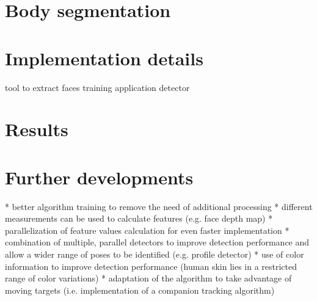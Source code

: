 \documentclass[a4paper,12pt,titlepage]{article}
\begin{document}
\section{Body segmentation}

\section{Implementation details}
tool to extract faces
training application
detector


\section{Results}

\section{Further developments}
* better algorithm training to remove the need of additional processing
* different measurements can be used to calculate features (e.g. face depth map)
* parallelization of feature values calculation for even faster implementation
* combination of multiple, parallel detectors to improve detection performance
  and allow a wider range of poses to be identified (e.g. profile detector)
* use of color information to improve detection performance (human skin lies in
  a restricted range of color variations)
* adaptation of the algorithm to take advantage of moving targets (i.e.
  implementation of a companion tracking algorithm)
\end{document}

